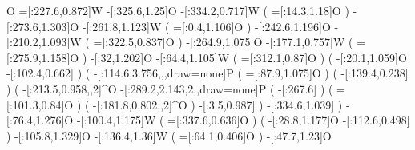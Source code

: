                            O%
            =[:227.6,0.872]W%
             -[:325.6,1.25]O%
            -[:334.2,0.717]W%
                              (
                  =[:14.3,1.18]O%
                              )
            -[:273.6,1.303]O%
            -[:261.8,1.123]W%
                              (
                  =[:0.4,1.106]O%
                              )
            -[:242.6,1.196]O%
            -[:210.2,1.093]W%
                              (
                =[:322.5,0.837]O%
                              )
            -[:264.9,1.075]O%
            -[:177.1,0.757]W%
                              (
                =[:275.9,1.158]O%
                              )
               -[:32,1.202]O%
             -[:64.4,1.105]W%
                              (
                 =[:312.1,0.87]O%
                              )
                              (
                 -[:20.1,1.059]O%
                -[:102.4,0.662]\phantom{W}%
                              )
                              (
    -[:114.6,3.756,,,draw=none]P%
                                  (
                     =[:87.9,1.075]O%
                                  )
                                  (
                    -[:139.4,0.238]%
                                  )
                                  (
                 -[:213.5,0.958,,2]^{\mcfminus}O%
       -[:289.2,2.143,2,,draw=none]P%
                                      (
                              -[:267.6]%
                                      )
                                      (
                         =[:101.3,0.84]O%
                                      )
                                      (
                     -[:181.8,0.802,,2]^{\mcfminus}O%
                                      )
                      -[:3.5,0.987]%
                                  )
                -[:334.6,1.039]%
                              )
             -[:76.4,1.276]O%
            -[:100.4,1.175]W%
                              (
                =[:337.6,0.636]O%
                              )
                              (
                 -[:28.8,1.177]O%
                -[:112.6,0.498]\phantom{W}%
                              )
            -[:105.8,1.329]O%
             -[:136.4,1.36]W%
                              (
                 =[:64.1,0.406]O%
                              )
              -[:47.7,1.23]O%

